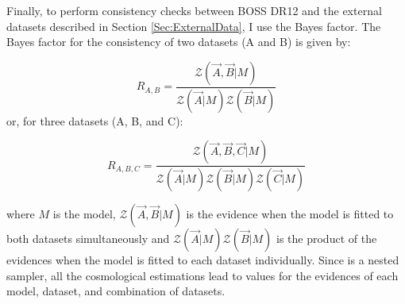 \qquad Finally, to perform consistency checks between BOSS DR12 and the external datasets described in Section \ref{Sec:ExternalData}, I use the Bayes factor. The Bayes factor for the consistency of two datasets (A and B) is given by:

\begin{equation}
R_{A,B} = \frac{\mathcal{Z}(\vec{A},\vec{B}|M)}{\mathcal{Z}(\vec{A}|M)\mathcal{Z}(\vec{B}|M)}
\label{Eq:BayesFactor}
\end{equation}
\noindent or, for three datasets (A, B, and C):

\begin{equation}
R_{A,B,C} = \frac{\mathcal{Z}(\vec{A},\vec{B},\vec{C}|M)}{\mathcal{Z}(\vec{A}|M)\mathcal{Z}(\vec{B}|M)\mathcal{Z}(\vec{C}|M)}
\label{Eq:BayesFactor}
\end{equation}

\noindent where $M$ is the model, $\mathcal{Z}(\vec{A},\vec{B}|M)$ is the evidence when the model is fitted to both datasets simultaneously and $\mathcal{Z}(\vec{A}|M)\mathcal{Z}(\vec{B}|M)$ is the product of the evidences when the model is fitted to each dataset individually. Since \pliny is a nested sampler, all the cosmological estimations lead to values for the evidences of each model, dataset, and combination of datasets.


